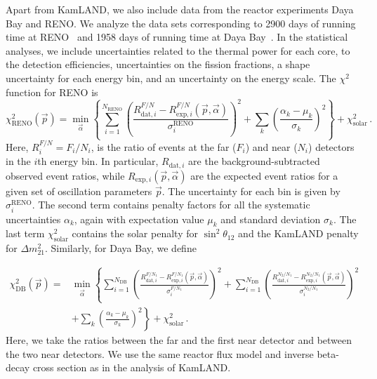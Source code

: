\documentclass[aps, prd, onecolumn, tightenlines, notitlepage, superscriptaddress, nofootinbib, preprintnumbers, floatfix,showkeys,11pt]{revtex4-2}
\begin{document}
Apart from KamLAND, we also include data from the reactor experiments Daya Bay and RENO. We analyze the data sets corresponding to 2900 days of running time at RENO~\cite{jonghee_yoo_2020_4123573} and 1958 days of running time at Daya Bay~\cite{DayaBay:2018yms}. 
%
In the statistical analyses, we include uncertainties related to the thermal power for each core, to the detection efficiencies, uncertainties on the fission fractions, a shape uncertainty for each energy bin, and an uncertainty on the energy scale.
%
The $\chi^2$ function for RENO is
\begin{equation}
\label{eq:RENOchi2}
 \chi^2_\text{RENO}(\vec{p}) = \min_{\vec{\alpha}}\left\{\sum_{i=1}^{N_\text{RENO}}\left(\frac{R^{F/N}_{\text{dat},i} - R^{F/N}_{\text{exp},i}(\vec{p},\vec{\alpha})}{\sigma^\text{RENO}_i}\right)^2 + \sum_k \left(\frac{\alpha_k - \mu_k}{\sigma_k} \right)^2\right\} + \chi^2_{\text{solar}}\,.
\end{equation}
Here, $R^{F/N}_i = F_i/N_i$, is the ratio of events at the far ($F_i$) and near ($N_i$) detectors in the $i$th energy bin. 
%
In particular, $R_{\text{dat},i}$ are the background-subtracted observed event ratios, while $R_{\text{exp},i}(\vec{p},\vec{\alpha})$ are the expected event ratios for a given set of oscillation parameters $\vec{p}$. 
%
The uncertainty for each bin is given by $\sigma^\text{RENO}_i$.
%
The second term contains penalty factors for all the systematic uncertainties $\alpha_k$, again with expectation value $\mu_k$ and standard deviation $\sigma_k$. The last term $\chi^2_{\text{solar}}$ contains the solar penalty for $\sin^2\theta_{12}$ and the KamLAND penalty for $\Delta m_{21}^2$.  Similarly, for Daya Bay, we define

\begin{align}
\label{eq:DBchi2}
 \chi^2_\text{DB}(\vec{p}) = &\min_{\vec{\alpha}}\left\{\sum_{i=1}^{N_\text{DB}}\left(\frac{R^{F/N_1}_{\text{dat},i} - R^{F/N_1}_{\text{exp},i}(\vec{p},\vec{\alpha})}{ \sigma_i^{F/N_1}}\right)^2  + \sum_{i=1}^{N_\text{DB}}\left(\frac{R^{N_2/N_1}_{\text{dat},i} - R^{N_2/N_1}_{\text{exp},i}(\vec{p},\vec{\alpha})}{\sigma_i^{N_2/N_1}}\right)^2 \right.\nonumber
 \\
&\left. +  \sum_k \left(\frac{\alpha_k - \mu_k}{\sigma_k} \right)^2\right\} + \chi^2_{\text{solar}}\,.
\end{align}
Here, we take the ratios between the far and the first near detector and between the two near detectors. 
%
We use the same reactor flux model and inverse beta-decay cross section as in the analysis of KamLAND. 
%
\end{document}
